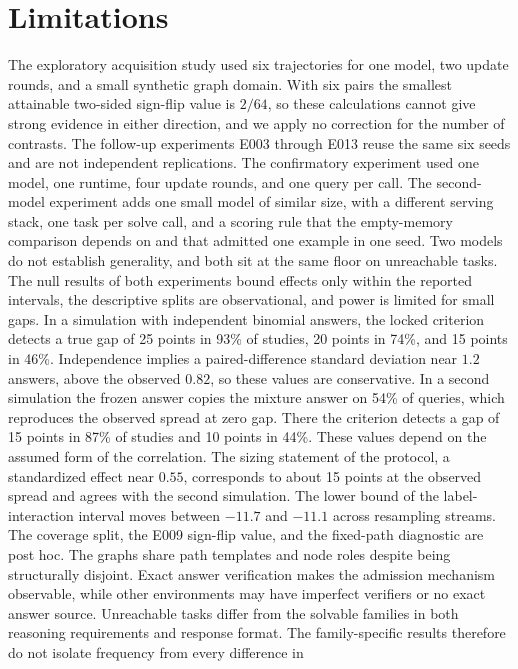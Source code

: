 \documentclass[11pt]{article}
\begin{document}
\section{Limitations}

The exploratory acquisition study used six trajectories for one model, two
update rounds, and a small synthetic graph domain. With six pairs the
smallest attainable two-sided sign-flip value is $2/64$, so these
calculations cannot give strong evidence in either direction, and we
apply no correction for the number of contrasts. The follow-up
experiments E003 through E013 reuse the same six seeds and are not
independent replications. The confirmatory experiment used one model,
one runtime, four update rounds, and one query per call. The
second-model experiment adds one small model of similar size, with a
different serving stack, one task per solve call, and a scoring rule
that the empty-memory comparison depends on and that admitted one
example in one seed. Two models do not
establish generality, and both sit at the same floor on unreachable
tasks. The null
results of both experiments bound effects only within the reported
intervals, the descriptive splits are observational, and power is
limited for small gaps. In a simulation with independent binomial answers, the
locked criterion detects a true gap of 25 points in 93\% of studies,
20 points in 74\%, and 15 points in 46\%. Independence implies a
paired-difference standard deviation near $1.2$ answers, above the
observed $0.82$, so these values are conservative. In a second
simulation the frozen answer copies the mixture answer on 54\% of
queries, which reproduces the observed spread at zero gap. There the
criterion detects a gap of 15 points in 87\% of studies and 10 points
in 44\%. These values depend on the assumed form of the correlation.
The sizing statement of the protocol, a standardized effect near
$0.55$, corresponds to about 15 points at the observed spread and
agrees with the second simulation. The lower bound of the label-interaction
interval moves between $-11.7$ and $-11.1$ across resampling streams. The coverage split, the
E009 sign-flip value, and the
fixed-path diagnostic are post hoc. The graphs share path
templates and node roles despite being structurally disjoint. Exact
answer verification makes the admission mechanism observable, while
other environments may have imperfect verifiers or no exact answer
source. Unreachable tasks differ from the solvable families in both
reasoning requirements and response format. The family-specific
results therefore do not isolate frequency from every difference in
\end{document}
